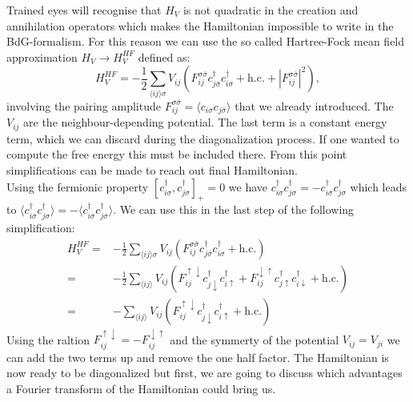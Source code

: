 \documentclass[../main.tex]{subfile}
\begin{document}
Trained eyes will recognise that $H_V$ is not quadratic in the creation and annihilation operators which makes the Hamiltonian impossible to write in the BdG-formalism. For this reason we can 
use the so called Hartree-Fock mean field approximation $H_V \rightarrow H^{HF}_V$ defined as:
\begin{equation}
    H^{HF}_V = -\frac{1}{2} \sum_{\langle ij\rangle \sigma} V_{ij} \left(F_{ij}^{\sigma \bar{\sigma}} c^{\dagger}_{j\bar{\sigma}}c^{\dagger}_{i\sigma} + \text{h.c.} 
    + |F_{ij}^{\sigma \bar{\sigma}}|^2\right),
\end{equation}
involving the pairing amplitude $F_{ij}^{\sigma \bar{\sigma}} = \langle c_{i\sigma}c_{j\bar{\sigma}}\rangle$ that we already introduced. The $V_{ij}$ are the neighbour-depending potential.
The last term is a constant energy term, which we can discard during the diagonalization process. If one wanted to compute the free energy this must be included there.
From this point simplifications can be made to reach out final Hamiltonian.\\

Using the fermionic property $[c_{i\sigma}^{\dagger},c_{j\sigma}^{\dagger}]_+ = 0$ we have $c_{i\sigma}^{\dagger} c_{j\sigma}^{\dagger} = -c_{i\sigma}^{\dagger} c_{j\sigma}^{\dagger}$
which leads to $\langle  c_{i\sigma}^{\dagger} c_{j\sigma}^{\dagger} \rangle = -\langle c_{i\sigma}^{\dagger} c_{j\sigma}^{\dagger}\rangle$. We can use this in the last step of the following simplification:
\begin{equation}\label{eq:HF_V}
    \begin{aligned}
        H^{HF}_V =& -\frac{1}{2} \sum_{\langle ij\rangle \sigma} V_{ij} \left(F_{ij}^{\sigma \bar{\sigma}} c^{\dagger}_{j\bar{\sigma}}c^{\dagger}_{i\sigma} + \text{h.c.}\right)\\
            =& -\frac{1}{2}\sum_{\langle ij\rangle} V_{ij} \left(F_{ij}^{\uparrow \downarrow} c^{\dagger}_{j\downarrow}c^{\dagger}_{i\uparrow} + F_{ij}^{\downarrow\uparrow} c^{\dagger}_{j\uparrow}c^{\dagger}_{i\downarrow} + \text{h.c.}\right)\\
            =& -\sum_{\langle ij\rangle} V_{ij} \left(F_{ij}^{\uparrow \downarrow} c^{\dagger}_{j\downarrow}c^{\dagger}_{i\uparrow} + \text{h.c.}\right)
    \end{aligned}
\end{equation}
Using the raltion $F_{ij}^{\uparrow\downarrow} = -F_{ij}^{\downarrow\uparrow}$ and the symmerty of the potential $V_{ij} = V_{ji}$ we can add the two terms up and remove the one half factor.
The Hamiltonian is now ready to be diagonalized but first, we are going to discuss which advantages a Fourier transform of the Hamiltonian could bring us.\\
 
\end{document}
